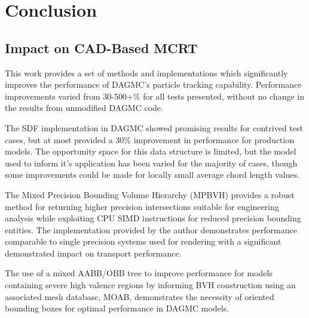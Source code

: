 
\chapter{Conclusion}\label{ch:conclusion}

\section{Impact on CAD-Based MCRT}

This work provides a set of methods and implementations which significantly
improves the performance of DAGMC's particle tracking capability. Performance
improvements varied from 30-500+\% for all tests presented, without no change in
the results from unmodified DAGMC code.

The SDF implementation in DAGMC showed promising results for contrived test
cases, but at most provided a 30\% improvement in performance for production
models. The opportunity space for this data structure is limited, but the model
used to inform it's application has been varied for the majority of cases,
though some improvements could be made for locally small average chord length
values.

The Mixed Precision Bounding Volume Hierarchy (MPBVH) provides a robust method
for returning higher precision intersections suitable for engineering analysis
while exploiting CPU SIMD instructions for reduced precision bounding
entities. The implementation provided by the author demonstrates performance
comparable to single precision systems used for rendering with a significant
demonstrated impact on transport performance.

The use of a mixed AABB/OBB tree to improve performance for models containing
severe high valence regions by informing BVH construction using an associated
mesh database, MOAB, demonstrates the necessity of oriented bounding boxes for
optimal performance in DAGMC models.

